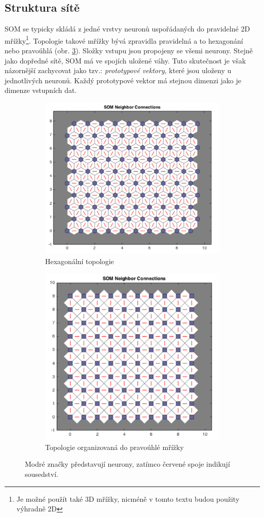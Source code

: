 \documentclass[thesis=M,czech]{FITthesis}[2012/06/26]
\begin{document}
\subsection{Struktura sítě}
SOM se typicky skládá z jedné vrstvy neuronů uspořádaných do pravidelné 2D mřížky\footnote{Je možné použít také 3D mřížky, nicméně v tomto textu budou použity výhradně 2D}. Topologie takové mřížky bývá zpravidla pravidelná a to hexagonání nebo pravoúhlá (obr. \ref{fig:top}). Složky vstupu jsou propojeny se všemi neurony.
Stejně jako dopředné sítě, SOM má ve spojích uložené váhy. Tuto skutečnost je však názornější zachycovat jako tzv.: \textit{prototypové vektory}, které jsou uloženy u jednotlivých neuronů. Každý prototypové vektor  má stejnou dimenzi jako je dimenze vstupních dat.

\begin{figure}
\centering
\begin{subfigure}{.5\textwidth}
  \centering
  \includegraphics[width=.8\linewidth]{hex_top}
  \caption{Hexagonální topologie}
  \label{fig:sub1}
\end{subfigure}%
\begin{subfigure}{.5\textwidth}
  \centering
  \includegraphics[width=.73\linewidth]{grid_top}
  \caption{Topologie organizovaná do pravoúhlé mřížky}
  \label{fig:sub2}
\end{subfigure}
\caption{Modré značky představují neurony, zatímco červené spoje indikují sousedství.}
\label{fig:top}
\end{figure}
\end{document}
